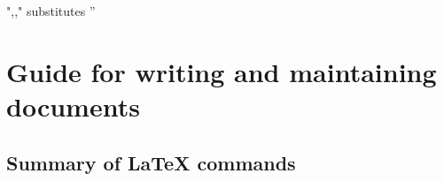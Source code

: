
",," 
substitutes 
% 
'' 
% 
% 
\newcommand{\bi}{ \begin{itemize} } 
\newcommand{\ei}{ \end{itemize} } 
\newcommand{\noi}{ \noindent} 
\newcommand{\ndoc}{ \verb/ndoc/} 
\newcommand{\ltoh}{ \verb/latex2html/ } 
\newcommand{\tex}{ \verb/.tex/ } 


\chapter{Guide for writing and maintaining \NEWSTAR documents} 

\tableofcontents 

\section{ Summary of \NEWSTAR LaTeX commands } 

